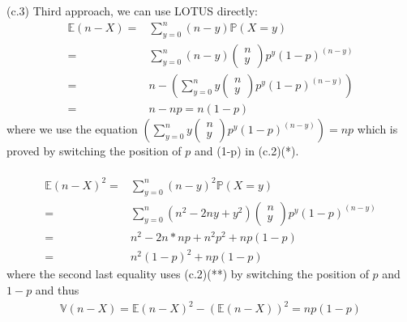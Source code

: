 \begin{exercise} [BH.4.21]
\begin{solution}
\begin{enumerate}
		~\\~~\\ 
		(c.3) Third approach, we can use LOTUS directly:
		\begin{align*}
			\mathbb{E}(n-X) =& \sum_{y=0}^{n} (n-y) \mathbb{P}(X=y) \\=& \sum_{y=0}^{n} (n-y) 	\left(\begin{matrix}
				n \\ y
			\end{matrix} \right) p^y(1-p)^{(n-y)} \\=& n -\left(\sum_{y=0}^{n} y 	\left(\begin{matrix}
				n \\ y
			\end{matrix} \right) p^y(1-p)^{(n-y)} \right) \\
			=& n- np =n(1-p)  
		\end{align*}
		where we use the equation $\left(\sum_{y=0}^{n} y 	\left(\begin{matrix}
			n \\ y
		\end{matrix} \right) p^y(1-p)^{(n-y)} \right) = np$ which is proved  by switching the position of $p$ and (1-p) in (c.2)(*). \\~\\
		\begin{align*}
			\mathbb{E}(n-X)^2 =& \sum_{y=0}^{n} (n-y)^2 \mathbb{P}(X=y) \\=& \sum_{y=0}^{n} (n^2-2ny +y^2) 	\left(\begin{matrix}
				n \\ y
			\end{matrix} \right) p^y(1-p)^{(n-y)} \\=& n^2  -2n *np + n^2p^2 + np(1-p) \\=& n^2(1-p)^2 + np(1-p)  
		\end{align*}
		where the second last equality uses (c.2)(**) by switching the position of $p$ and $1-p$
		and thus  
		\begin{align*}
			\mathbb{V}(n-X)=\mathbb{E}(n-X)^2 -\left(\mathbb{E}(n-X)\right)^2 = np(1-p)
		\end{align*}
	\end{enumerate}
\end{solution}
\end{exercise}

